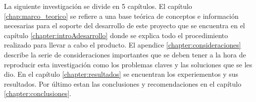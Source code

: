 La siguiente investigaci\'on se divide en 5 cap\'itulos. El cap\'itulo \ref{chap:marco_teorico} se refiere a una base te\'orica de conceptos e informaci\'on necesarias para el soporte del desarrollo de este proyecto que se encuentra en el cap\'itulo  \ref{chapter:introAdesarrollo} donde se explica todo el procedimiento realizado para llevar a cabo el producto. El apendice \ref{chapter:consideraciones} describe la serie de consideraciones importantes que se deben tener a la hora de reproducir esta investigaci\'on como los problemas claves y las soluciones que se les dio. En el cap\'itulo \ref{chapter:resultados} se encuentran  los experiementos y sus resultados. Por \'ultimo estan las conclusiones y recomendaciones en el capítulo \ref{chapter:conclusiones}. 
